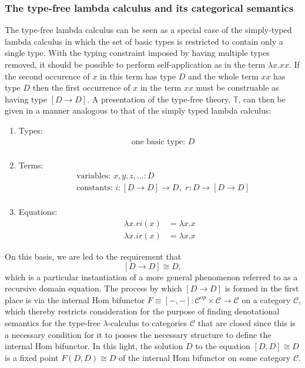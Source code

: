 \subsubsection*{The type-free lambda calculus and its categorical semantics}
The type-free lambda calculus can be seen as a special case of the simply-typed lambda calculus in which the set of basic types is restricted to contain only a single type. With the typing constraint imposed by having multiple types removed, it should be possible to perform self-application as in the term $\lambda x. xx$. If the second occurence of $x$ in this term has type $D$ and the whole term $xx$ has type $D$ then the first occurrence of $x$ in the term $xx$ must be construable as having type $[D \rightarrow D]$. A presentation of the type-free theory, $\mathbb{T}$, can then be given in a manner analogous to that of the simply typed lambda calculus:
\begin{enumerate}
\item{Types:}
\begin{align*}
&\mbox{one basic type: } D\\
\end{align*}
\item{Terms:}
\begin{align*}
&\mbox{variables: } x,y,z, \ldots \colon D\\
&\mbox{constants: } i \colon [D \rightarrow D] \rightarrow D,\,\, r \colon D \rightarrow [D \rightarrow D]\\ 
\end{align*}
\item{Equations:}
\begin{align*}
            \lambda x. ri(x) &= \lambda x.x\\
            \lambda x. ir(x) &= \lambda x.x
\end{align*}
\end{enumerate}
On this basis, we are led to the requirement that
$$
[D \rightarrow D] \cong D,
$$
which is a particular instantiation of a more general phenomenon referred to as a recursive domain equation. The process by which $[D \rightarrow D]$ is formed in the first place is via the internal Hom bifunctor $F \equiv [-,-] \colon \mathcal{C}^{op} \times \mathcal{C} \rightarrow \mathcal{C}$ on a category $\mathcal{C}$, which thereby restricts consideration for the purpose of finding denotational semantics for the type-free $\lambda$-calculus to categories $\mathcal{C}$ that are closed since this is a necessary condition for it to posses the necessary structure to define the internal Hom bifunctor. In this light, the solution $D$ to the equation $[D,D] \cong D$ is a fixed point $F(D,D) \cong D$ of the internal Hom bifunctor on some category $\mathcal{C}$.

